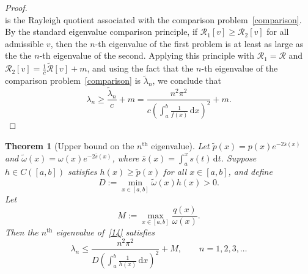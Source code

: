 \documentclass[11pt, reqno]{amsart}
\numberwithin{equation}{section}  %
\theoremstyle{plain}
\newtheorem{theorem}{Theorem}[section]
\theoremstyle{definition}
\theoremstyle{remark}
\begin{document}
\begin{proof}
\[\]
is the Rayleigh quotient associated with the comparison problem~\eqref{comparison}.
By the standard eigenvalue comparison principle, if $\mathcal{R}_1[v]\ge \mathcal{R}_2[v]$ for all admissible $v$,
then the $n$-th eigenvalue of the first problem is at least as large as the the $n$-th eigenvalue of the second. Applying this principle with $\mathcal{R}_1=\mathcal{R}$ and
$\mathcal{R}_2[v]=\frac{1}{c}\tilde{\mathcal{R}}[v]+m$, and using the fact that the $n$-th eigenvalue of the
comparison problem~\eqref{comparison} is $\tilde{\lambda}_n$, we conclude that
\[
\lambda_n \ge \frac{\tilde{\lambda}_n}{c}+m
= \frac{n^2\pi^2}{c\left(\displaystyle\int_a^b \frac{1}{f(x)}\,\mathrm{d}x\right)^2}+m.
\] \qedhere
\end{proof}



\begin{theorem}[Upper bound on the $n^{\text{th}}$ eigenvalue]
\label{th:upper-bound}
Let $\tilde{p}(x) = p(x)e^{-2\bar{s}(x)}$ and $\tilde{\omega}(x) = \omega(x)e^{-2\bar{s}(x)}$, where $\bar{s}(x) = \int_a^x s(t)\,\mathrm{d}t$. Suppose $h \in C([a,b])$ satisfies $h(x) \geq \tilde{p}(x)$ for all $x \in [a,b]$, and define
\[
D := \min_{x \in [a,b]} \tilde{\omega}(x)h(x) > 0.
\]
Let
\[
M := \max_{x \in [a,b]} \frac{q(x)}{\omega(x)}.
\]
Then the $n^{\text{th}}$ eigenvalue of~\eqref{14} satisfies
\[
\lambda_n \leq \frac{n^2\pi^2}{D\left(\displaystyle\int_a^b \frac{1}{h(x)}\,\mathrm{d}x\right)^2} + M, \qquad n = 1, 2, 3, \ldots
\]
\end{theorem}
\end{document}
